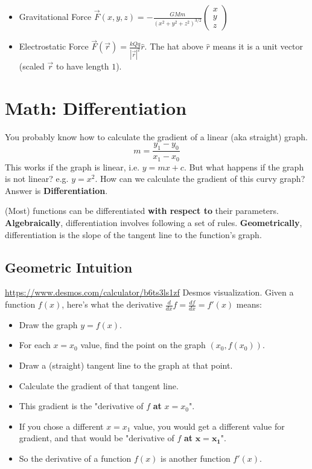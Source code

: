 \documentclass{article}
\begin{document}
\begin{itemize}
    \item Gravitational Force $\vec{F}(x,y,z) = -\frac{GMm}{(x^2 + y^2 + z^2)^{3/2}} \left(\begin{array}{l}
x \\
y \\ 
z
\end{array}\right)$
    \item Electrostatic Force $\vec{F}(\vec{r}) = \frac{kQq}{|\vec{r}|^2} \hat{r}$. The hat above $\hat{r}$ means it is a unit vector (scaled $\vec{r}$ to have length $1$).
\end{itemize}

\section{Math: Differentiation}
You probably know how to calculate the gradient of a linear (aka straight) graph.
$$m = \frac{y_1 - y_0}{x_1 - x_0}$$
This works if the graph is linear, i.e. $y=mx+c$. But what happens if the graph is not linear? e.g. $y = x^2$. How can we calculate the gradient of this curvy graph? Answer is \textbf{Differentiation}.

(Most) functions can be differentiated \textbf{with respect to} their parameters. \textbf{Algebraically}, differentiation involves following a set of rules. \textbf{Geometrically}, differentiation is the slope of the tangent line to the function's graph. 

\subsection{Geometric Intuition}
\url{https://www.desmos.com/calculator/b6ts3ls1zf} Desmos visualization. Given a function $f(x)$, here's what the derivative $\frac{d}{dx}f = \frac{df}{dx} = f'(x)$ means:
\begin{itemize}
    \item Draw the graph $y=f(x)$.
    \item For each $x = x_0$ value, find the point on the graph $(x_0,f(x_0))$.
    \item Draw a (straight) tangent line to the graph at that point.
    \item Calculate the gradient of that tangent line.
    \item This gradient is the "derivative of $f$ \textbf{at }$x=x_0$".
    \item If you chose a different $x=x_1$ value, you would get a different value for gradient, and that would be "derivative of $f$ \textbf{at }$\mathbf{x=x_1}$".
    \item So the derivative of a function $f(x)$ is another function $f'(x)$.
\end{itemize}
\end{document}
